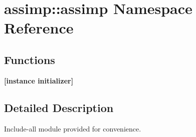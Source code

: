 \hypertarget{namespaceassimp_1_1assimp}{\section{assimp\+:\+:assimp Namespace Reference}
\label{namespaceassimp_1_1assimp}
}
\subsection*{Functions}
\begin{DoxyCompactItemize}
\item 
\hypertarget{namespaceassimp_1_1assimp_a43785525c95a41d9c9398b3110524605}{{\bfseries \mbox{[}instance initializer\mbox{]}}}\label{namespaceassimp_1_1assimp_a43785525c95a41d9c9398b3110524605}

\end{DoxyCompactItemize}


\subsection{Detailed Description}
Include-\/all module provided for convenience. 